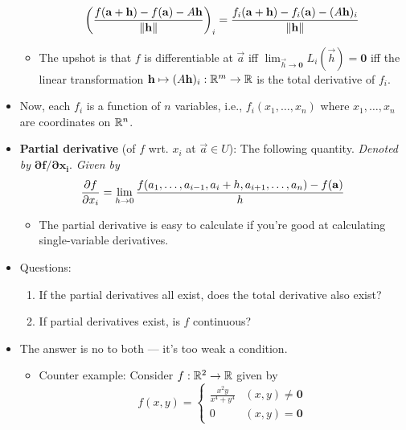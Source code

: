\documentclass[../notes.tex]{subfiles}
\begin{document}
\begin{itemize}
\begin{itemize}
        \begin{equation*}
            \left( \frac{f(\mathbf{a}+\mathbf{h})-f(\mathbf{a})-A\mathbf{h}}{\norm{\mathbf{h}}} \right)_i = \frac{f_i(\mathbf{a}+\mathbf{h})-f_i(\mathbf{a})-(A\mathbf{h})_i}{\norm{\mathbf{h}}}
        \end{equation*}
        \item The upshot is that $f$ is differentiable at $\vec{a}$ iff $\lim_{\vec{h}\to\bm{0}}L_i(\vec{h})=\bm{0}$ iff the linear transformation $\mathbf{h}\mapsto(A\mathbf{h})_i:\mathbb{R}^m\to\mathbb{R}$ is the total derivative of $f_i$.
    \end{itemize}
    \item Now, each $f_i$ is a function of $n$ variables, i.e., $f_i(x_1,\dots,x_n)$ where $x_1,\dots,x_n$ are coordinates on $\mathbb{R}^n$.
    \item {}\textbf{Partial derivative} (of $f$ wrt. $x_i$ at $\vec{a}\in U$): The following quantity. \emph{Denoted by} $\bm{\partial f/\partial x_i}$. \emph{Given by}
    \begin{equation*}
        \pdv{f}{x_i}(\mathbf{a}) = \lim_{h\to 0}\frac{f(a_1,\dots,a_{i-1},a_i+h,a_{i+1},\dots,a_n)-f(\mathbf{a})}{h}
    \end{equation*}
    \begin{itemize}
        \item The partial derivative is easy to calculate if you're good at calculating single-variable derivatives.
    \end{itemize}
    \item Questions:
    \begin{enumerate}
        \item If the partial derivatives all exist, does the total derivative also exist?
        \item If partial derivatives exist, is $f$ continuous?
    \end{enumerate}
    \item The answer is no to both --- it's too weak a condition.
    \begin{itemize}
        \item Counter example: Consider $f:\mathbb{R}^2\to\mathbb{R}$ given by
        \begin{equation*}
            f(x,y) =
            \begin{cases}
                \frac{x^2y}{x^4+y^4} & (x,y)\neq\bm{0}\\
                0 & (x,y)=\bm{0}
            \end{cases}
        \end{equation*}

\end{itemize}
\end{itemize}
\end{document}
